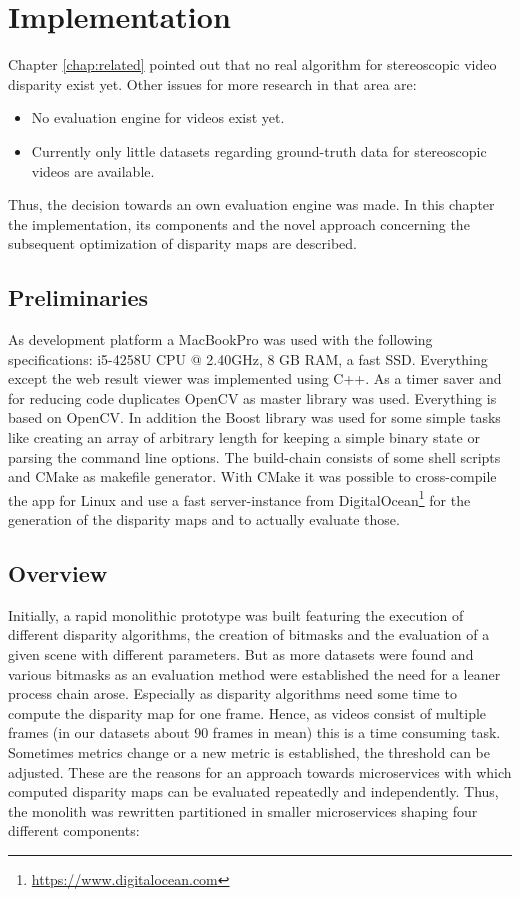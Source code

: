 \chapter{Implementation}
\label{chap:impl}

Chapter \ref{chap:related} pointed out that no real algorithm for stereoscopic video disparity exist yet.
Other issues for more research in that area are:

\begin{itemize}
  \item No evaluation engine for videos exist yet.
  \item Currently only little datasets regarding ground-truth data for stereoscopic videos are available.
\end{itemize}

\noindent Thus, the decision towards an own evaluation engine was made.
In this chapter the implementation, its components and the novel approach concerning the subsequent optimization of disparity maps are described.

\section{Preliminaries}

As development platform a MacBookPro was used with the following specifications: i5-4258U CPU @ 2.40GHz, 8 GB RAM, a fast SSD.
Everything except the web result viewer was implemented using C++.
As a timer saver and for reducing code duplicates OpenCV as master library was used.
Everything is based on OpenCV.
In addition the Boost library was used for some simple tasks like creating an array of arbitrary length for keeping a simple binary state or parsing the command line options.
The build-chain consists of some shell scripts and CMake as makefile generator.
With CMake it was possible to cross-compile the app for Linux and use a fast server-instance from DigitalOcean\footnote{\url{https://www.digitalocean.com}} for the generation of the disparity maps and to actually evaluate those.

\section{Overview}

Initially, a rapid monolithic prototype was built featuring the execution of different disparity algorithms, the creation of bitmasks and the evaluation of a given scene with different parameters.
But as more datasets were found and various bitmasks as an evaluation method were established the need for a leaner process chain arose.
Especially as disparity algorithms need some time to compute the disparity map for one frame.
Hence, as videos consist of multiple frames (in our datasets about 90 frames in mean) this is a time consuming task.
Sometimes metrics change or a new metric is established, the threshold can be adjusted.
These are the reasons for an approach towards microservices with which computed disparity maps can be evaluated repeatedly and independently.
Thus, the monolith was rewritten partitioned in smaller microservices shaping four different components:

